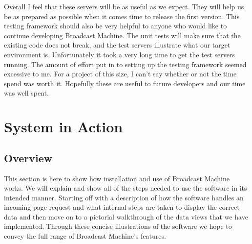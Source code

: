 \documentclass[a4paper,12pt]{report}
\begin{document}
Overall I feel that these servers will be as useful as we expect.
They will help us be as prepared as possible when it comes time to release the first version.
This testing framework should also be very helpful to anyone who would like to continue developing Broadcast Machine.
The unit tests will make sure that the existing code does not break, and the test servers illustrate what our target environment is.
Unfortunately it took a very long time to get the test servers running.
The amount of effort put in to setting up the testing framework seemed excessive to me.
For a project of this size, I can't say whether or not the time spend was worth it.
Hopefully these are useful to future developers and our time was well spent. 

\chapter{System in Action}
\section{Overview}
This section is here to show how installation and use of Broadcast Machine works. 
We will explain and show all of the steps needed to use the software in its intended manner.
Starting off with a description of how the software handles an incoming page request and what internal steps are taken to display the correct data and then move on to a pictorial walkthrough of the data views that we have implemented.
Through these concise illustrations of the software we hope to convey the full range of Broadcast Machine's features.
\end{document}
